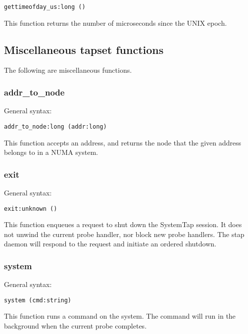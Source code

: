 \documentclass[twoside,english]{article}
\newenvironment{vindent}
{\begin{list}{}{\setlength{\listparindent}{6pt}}
\item[]}
{\end{list}}
\begin{document}
\begin{vindent}
\begin{verbatim}
gettimeofday_us:long ()
\end{verbatim}
\end{vindent}
This function returns the number of microseconds since the UNIX epoch.


\subsection{Miscellaneous tapset functions}

The following are miscellaneous functions.


\subsubsection{addr\_to\_node}
General syntax:

\begin{vindent}
\begin{verbatim}
addr_to_node:long (addr:long)
\end{verbatim}
\end{vindent}
This function accepts an address, and returns the node that the given address
belongs to in a NUMA system.


\subsubsection{exit}
General syntax:

\begin{vindent}
\begin{verbatim}
exit:unknown ()
\end{verbatim}
\end{vindent}
This function enqueues a request to shut down the SystemTap session. It does
not unwind the current probe handler, nor block new probe handlers. The stap
daemon will respond to the request and initiate an ordered shutdown.


\subsubsection{system}
General syntax:

\begin{vindent}
\begin{verbatim}
system (cmd:string)
\end{verbatim}
\end{vindent}
This function runs a command on the system. The command will run in the background
when the current probe completes.
\end{document}

